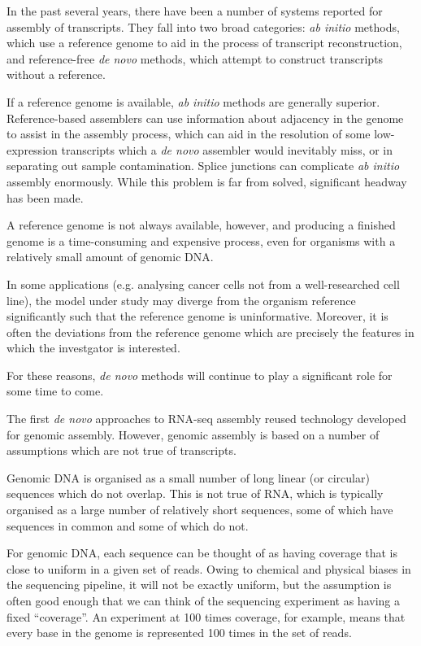 \documentclass{bioinfo}
\def\abinitio{\textit{ab initio}}
\def\denovo{\textit{de novo}}
\begin{document}
In the past several years, there have been a number of systems reported
for assembly of transcripts.
They fall into two broad categories: \abinitio{}
methods, which use a reference genome to aid in the process of transcript
reconstruction, and reference-free \denovo{} methods, which attempt to
construct transcripts without a reference.

If a reference genome is available, \abinitio{} methods are generally
superior.
Reference-based assemblers can use information about adjacency in the
genome to assist in the assembly process, which can aid in the resolution
of some low-expression transcripts which a \denovo{} assembler would
inevitably miss, or in separating out sample contamination.
Splice junctions can complicate \abinitio{} assembly enormously.
While this problem is far from solved, significant headway has been made.

A reference genome is not always available, however, and
producing a finished genome is a time-consuming and
expensive process, even for organisms with a relatively small amount
of genomic DNA.

In some applications (e.g. analysing cancer cells not from a
well-researched cell line), the model under study may diverge from
the organism reference significantly such that the reference
genome is uninformative.
Moreover, it is often the deviations from the reference genome
which are precisely the features in which the investgator is
interested.

For these reasons, \denovo{} methods will continue to play a
significant role for some time to come.

The first \denovo{} approaches to RNA-seq assembly reused technology
developed for genomic assembly.
However, genomic assembly is based on a number of assumptions which
are not true of transcripts.

Genomic DNA is organised as a small number of long linear (or
circular) sequences which do not overlap.
This is not true of RNA, which is typically organised as a large
number of relatively short sequences, some of which have sequences
in common and some of which do not.

For genomic DNA, each sequence can be thought of as having coverage
that is close to uniform in a given set of reads.
Owing to chemical and physical biases in the sequencing pipeline, it
will not be exactly uniform, but the assumption is often good enough
that we can think of the sequencing experiment as having a fixed
``coverage''.
An experiment at 100 times coverage, for example, means that every
base in the genome is represented 100 times in the set of reads.
\end{document}
